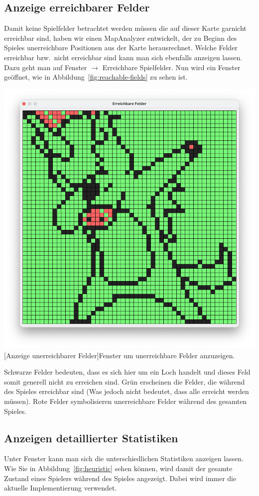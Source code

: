 \subsection{Anzeige erreichbarer Felder}\label{subsec:anzeige-erreichbarer-felder}
Damit keine Spielfelder betrachtet werden m\"ussen die auf dieser Karte garnicht erreichbar sind, haben wir einen MapAnalyzer entwickelt, der zu Beginn des Spieles unerreichbare Positionen aus der Karte herausrechnet.
Welche Felder erreichbar bzw.\ nicht erreichbar sind kann man sich ebenfalls anzeigen lassen.
Dazu geht man auf Fenster $\rightarrow$ Erreichbare Spielfelder.
Nun wird ein Fenster ge\"offnet, wie in Abbildung~\ref{fig:reachable-fields} zu sehen ist.

\vspace{1em}
\begin{minipage}{\linewidth}
    \centering
    \includegraphics[width=0.6\linewidth]{pics/reachable-fields}
    [Anzeige unerreichbarer Felder]{Fenster um unerreichbare Felder anzuzeigen.}
    \label{fig:reachable-fields}
\end{minipage}

Schwarze Felder bedeuten, dass es sich hier um ein Loch handelt und dieses Feld somit generell nicht zu erreichen sind.
Gr\"un erscheinen die Felder, die w\"ahrend des Spieles erreichbar sind (Was jedoch nicht bedeutet, dass alle erreicht werden m\"ussen).
Rote Felder symbolisieren unerreichbare Felder w\"ahrend des gesamten Spieles.

\subsection{Anzeigen detaillierter Statistiken}\label{subsec:anzeigen-detaillierter-statistiken}
Unter Fenster kann man sich die unterschiedlichen Statistiken anzeigen lassen.
Wie Sie in Abbildung~\ref{fig:heuristic} sehen k\"onnen, wird damit der gesamte Zustand eines Spielers w\"ahrend des Spieles angezeigt.
Dabei wird immer die aktuelle Implementierung verwendet.

